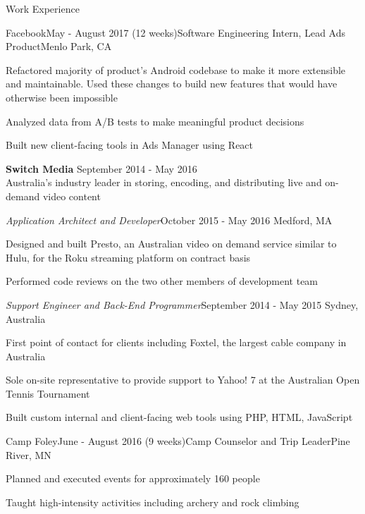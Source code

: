 \documentclass{resume}
\begin{document}
  \begin{rSection}{Work Experience}
  
  	\begin{rSubsection}{Facebook}{May - August 2017 (12 weeks)}{Software Engineering Intern, Lead Ads Product}{Menlo Park, CA}
  	\item Refactored majority of product's Android codebase to make it more extensible and maintainable. Used these changes to build new features that would have otherwise been impossible
    \item Analyzed data from A/B tests to make meaningful product decisions
    \item Built new client-facing tools in Ads Manager using React
    \end{rSubsection}
    
    {\bf Switch Media} \hfill { September 2014 - May 2016}\\ 
    { Australia's industry leader in storing, encoding, and distributing live and on-demand video content} 

 \begin{addmargin}[2em]{0em}   
 
   \begin{rSubsection}{\normalfont\em Application Architect and Developer}{October 2015 - May 2016}{ }{\hfill Medford, MA}
    \item Designed and built Presto, an Australian video on demand service similar to Hulu, for the Roku streaming platform on contract basis
    \item Performed code reviews on the two other members of development team
    \end{rSubsection}
    
   \begin{rSubsection}{\normalfont\em Support Engineer and Back-End Programmer}{September 2014 - May 2015}{ }{Sydney, Australia}
    \item First point of contact for clients including Foxtel, the largest cable company in Australia
    \item Sole on-site representative to provide support to Yahoo! 7 at the Australian Open Tennis Tournament
    \item Built custom internal and client-facing web tools using PHP, HTML, JavaScript
    \end{rSubsection}
\end{addmargin}  
  
    \begin{rSubsection}{Camp Foley}{June - August 2016 (9 weeks)}{Camp Counselor and Trip Leader}{Pine River, MN}
    \item Planned and executed events for approximately 160 people
    \item Taught high-intensity activities including archery and rock climbing
    \end{rSubsection}
  
  \end{rSection}
  
\end{document}
